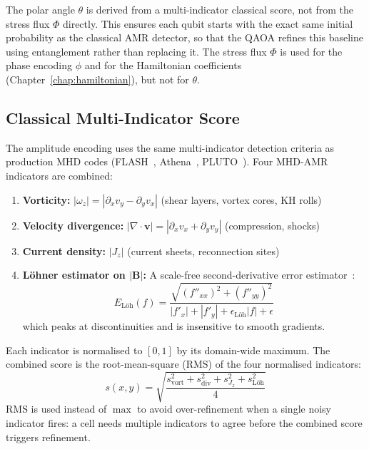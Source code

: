 \documentclass[12pt, a4paper, oneside]{report}
\begin{document}
The polar angle $\theta$ is derived from a multi-indicator classical score, not from the stress flux $\Phi$ directly. This ensures each qubit starts with the exact same initial probability as the classical AMR detector, so that the QAOA refines this baseline using entanglement rather than replacing it. The stress flux $\Phi$ is used for the phase encoding $\phi$ and for the Hamiltonian coefficients (Chapter~\ref{chap:hamiltonian}), but not for $\theta$.

\subsection{Classical Multi-Indicator Score}
\label{sec:classical-score}

The amplitude encoding uses the same multi-indicator detection criteria as production MHD codes (FLASH~\cite{fryxell2000}, Athena~\cite{stone2008}, PLUTO~\cite{mignone2007}). Four MHD-AMR indicators are combined:
\begin{enumerate}
    \item \textbf{Vorticity:} $|\omega_z| = |\partial_x v_y - \partial_y v_x|$ \quad (shear layers, vortex cores, KH rolls)
    \item \textbf{Velocity divergence:} $|\nabla \cdot \mathbf{v}| = |\partial_x v_x + \partial_y v_y|$ \quad (compression, shocks)
    \item \textbf{Current density:} $|J_z|$ \quad (current sheets, reconnection sites)
    \item \textbf{L\"ohner estimator on $|\mathbf{B}|$:} A scale-free second-derivative error estimator~\cite{lohner1987}:
    \begin{equation}
        E_{\text{L\"oh}}(f) = \frac{\sqrt{(f''_{xx})^2 + (f''_{yy})^2}}{|f'_x| + |f'_y| + \epsilon_{\text{L\"oh}} |f| + \epsilon}
    \end{equation}
    which peaks at discontinuities and is insensitive to smooth gradients.
\end{enumerate}
Each indicator is normalised to $[0, 1]$ by its domain-wide maximum. The combined score is the root-mean-square (RMS) of the four normalised indicators:
\begin{equation}
    s(x,y) = \sqrt{\frac{s_{\text{vort}}^2 + s_{\text{div}}^2 + s_{J_z}^2 + s_{\text{L\"oh}}^2}{4}}
    \label{eq:classical-score}
\end{equation}
RMS is used instead of $\max$ to avoid over-refinement when a single noisy indicator fires: a cell needs multiple indicators to agree before the combined score triggers refinement.
\end{document}
